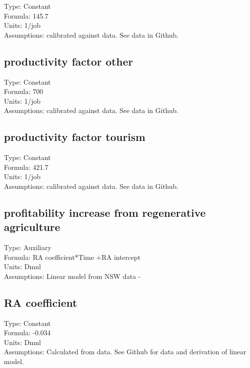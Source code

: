 \documentclass[
  11pt,
]{book}
\begin{document}
Type: Constant\\
Formula: 145.7\\
Units: 1/job\\
Assumptions: calibrated against data. See data in Github.

\hypertarget{productivity-factor-other}{%
\subsection{productivity factor other}\label{productivity-factor-other}}

Type: Constant\\
Formula: 700\\
Units: 1/job\\
Assumptions: calibrated against data. See data in Github.

\hypertarget{productivity-factor-tourism}{%
\subsection{productivity factor tourism}\label{productivity-factor-tourism}}

Type: Constant\\
Formula: 421.7\\
Units: 1/job\\
Assumptions: calibrated against data. See data in Github.

\hypertarget{profitability-increase-from-regenerative-agriculture}{%
\subsection{profitability increase from regenerative agriculture}\label{profitability-increase-from-regenerative-agriculture}}

Type: Auxiliary\\
Formula: RA coefficient*Time +RA intercept\\
Units: Dmnl\\
Assumptions: Linear model from NSW data - \citet{ogilvy_graziers_2018}

\hypertarget{ra-coefficient}{%
\subsection{RA coefficient}\label{ra-coefficient}}

Type: Constant\\
Formula: -0.034\\
Units: Dmnl\\
Assumptions: Calculated from data. See Github for data and derivation of linear model.
\end{document}

